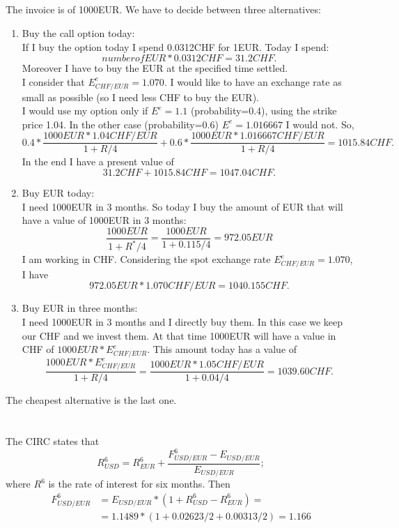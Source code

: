 \documentclass[	11pt, ]{fphw}
\begin{document}
\subsection{}
The invoice is of 1000EUR. We have to decide between three alternatives: 
\begin{enumerate}
    \item Buy the call option today: \\
    If I buy the option today I spend 0.0312CHF for 1EUR. Today I spend: 
    \[ number of EUR * 0.0312CHF = 31.2 CHF. \]
    Moreover I have to buy the EUR at the specified time settled. \\
    I consider that $E^{e}_{CHF/EUR}=1.070$. I would like to have an exchange rate as small as possible (so I need less CHF to buy the EUR). \\
    I would use my option only if $E^{e}=1.1$ (probability=0.4), using the strike price 1.04. In the other case (probability=0.6) $E^{e}=1.016667$ I would not. So,
     \[ 0.4* \frac{1000EUR*1.04CHF/EUR}{1+R/4}+0.6* \frac{1000EUR*1.016667CHF/EUR}{1+R/4}= 1015.84CHF. \]
     In the end I have a present value of  \[ 31.2 CHF+1015.84CHF= 1047.04 CHF.\]
     
    \item Buy EUR today: \\
    I need 1000EUR in 3 months. So today I buy the amount of EUR that will have a value of 1000EUR in 3 months: 
    \[ \frac{1000EUR}{1+R^{*}/4} =  \frac{1000EUR}{1+0.115/4} = 972.05 EUR\]
    I am working in CHF. Considering the spot exchange rate $E^{e}_{CHF/EUR}=1.070$, I have \[ 972.05 EUR*1.070CHF/EUR= 1040.155 CHF.\]
    
    
    \item Buy EUR in three months: \\
     I need 1000EUR in 3 months and I directly buy them. In this case we keep our CHF and we invest them. At that time 1000EUR will have a value in CHF of $1000EUR*E^{e}_{CHF/EUR}$. This amount today has a value of
     \[ \frac{1000EUR*E^{e}_{CHF/EUR}}{1+R/4}=\frac{1000EUR*1.05CHF/EUR}{1+0.04/4}= 1039.60 CHF. \]
\end{enumerate}
The cheapest alternative is the last one.


\section{}
\subsection{}
The CIRC states that 
\[ R_{USD}^{6}=R_{EUR}^{6}+\frac{F_{USD/EUR}^{6}-E_{USD/EUR}}{E_{USD/EUR}};
\]
where $R^{6}$ is the rate of interest for six months. Then
\[\begin{aligned}
    F_{USD/EUR}^{6}&=  E_{USD/EUR}*(1+R_{USD}^{6}-R_{EUR}^{6})= \\
                    &= 1.1489* (1 + 0.02623/2 + 0.00313/2)= 1.166
\end{aligned}\]
\end{document}
